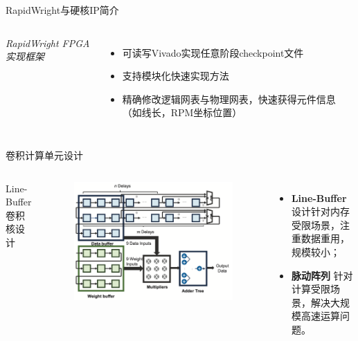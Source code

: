 \documentclass[10pt]{beamer}
\begin{document}
\begin{frame}{RapidWright与硬核IP简介}
\begin{columns}[T, onlytextwidth]
{    \emph{RapidWright FPGA实现框架}
    \begin{itemize}
      \item 可读写Vivado实现任意阶段checkpoint文件
      \item 支持模块化快速实现方法
      \item 精确修改逻辑网表与物理网表，快速获得元件信息（如线长，RPM坐标位置）
    \end{itemize}
    }
  
\end{columns}

\end{frame}

\begin{frame}{卷积计算单元设计}

  \begin{columns}[T, onlytextwidth]
    \begin{center}
      \vspace{-0.5cm}
      {\small Line-Buffer卷积核设计} 
      \vspace{-0.5cm}
    \end{center}
    \begin{figure}
      \includegraphics[width=\textwidth]{img/line-buffer.png}
    \end{figure}

    {\fontsize{8}{12}
    \begin{itemize}
      \item {\bf Line-Buffer} 设计针对内存受限场景，注重数据重用，规模较小；
      \item {\bf 脉动阵列} 针对计算受限场景，解决大规模高速运算问题。
    \end{itemize}
    }
    


\end{columns}
\end{frame}
\end{document}
